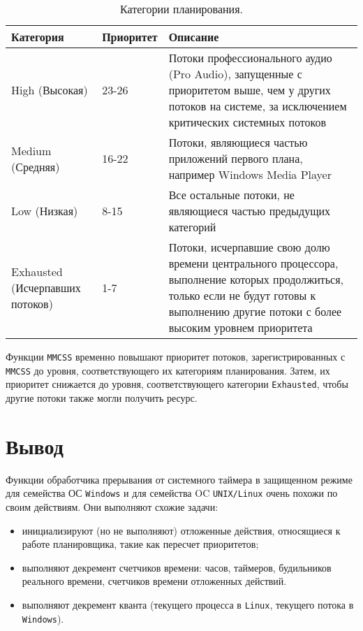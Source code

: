\documentclass[a4paper,12pt]{bmstu}
\begin{document}
\begin{table}[h]
    \caption{Категории планирования.}
    \begin{center}
        \begin{tabular}{|p{40mm}|p{30mm}|p{80mm}|}
            \hline
            \textbf{Категория} & \textbf{Приоритет} & \textbf{Описание} \\
            \hline
            High (Высокая) & 23-26 & Потоки профессионального аудио (Pro Audio), запущенные с приоритетом выше, чем у других потоков на системе, за исключением критических системных потоков \\
            \hline
            Medium (Средняя) & 16-22 & Потоки, являющиеся частью приложений первого плана, например Windows Media Player \\
            \hline
            Low (Низкая) & 8-15 & Все остальные потоки, не являющиеся частью предыдущих категорий \\
            \hline
            Exhausted (Исчерпавших потоков) & 1-7 & Потоки, исчерпавшие свою долю времени центрального процессора, выполнение которых продолжиться, только если не будут готовы к выполнению другие потоки с более высоким уровнем приоритета \\
            \hline
        \end{tabular}
    \end{center}
    \label{tab:plan}
\end{table}

Функции \texttt{MMCSS} временно повышают приоритет потоков, зарегистрированных с \texttt{MMCSS} до уровня, соответствующего их категориям планирования.  Затем, их приоритет снижается до уровня, соответствующего категории \texttt{Exhausted}, чтобы другие потоки также могли получить ресурс.

\chapter*{Вывод}

Функции обработчика прерывания от системного таймера в защищенном режиме для семейства ОС \texttt{Windows} и для семейства OC \texttt{UNIX/Linux} очень похожи по своим действиям. Они выполняют схожие задачи:

\begin{itemize}
    \item инициализируют (но не выполняют) отложенные действия, относящиеся к работе планировщика, такие как пересчет приоритетов;
    \item выполняют декремент счетчиков времени: часов, таймеров, будильников реального времени, счетчиков времени отложенных действий.
    \item выполняют декремент кванта (текущего процесса в \texttt{Linux}, текущего потока в \texttt{Windows}).
\end{itemize}
\end{document}
